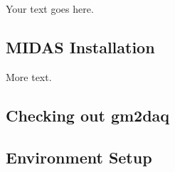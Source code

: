 Your text goes here.

\subsection{MIDAS Installation}

More text.

\subsection{Checking out gm2daq}

\subsection{Environment Setup}
